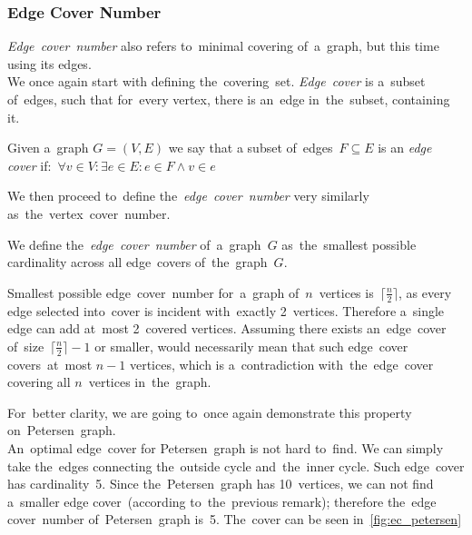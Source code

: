 \subsubsection{Edge Cover Number}
\label{subsubsec:EdgeCoverNumber}
\textit{Edge~cover~number} also refers to~minimal covering of~a~graph, but this time using its edges.\\
We once again start with defining the~covering~set. \textit{Edge~cover} is a~subset of~edges, such that for~every vertex, there is an~edge in~the~subset, containing it.
\begin{definition}
    Given a~graph ${G = (V, E)}$ we say that a subset of~edges~${F \subseteq E}$ is an \emph{edge cover} if: ${\,\forall v \in V: \exists e \in E: e \in F \land v \in e}$
\end{definition}
We then proceed to~define the~\textit{edge~cover~number} very similarly as~the~vertex~cover~number.
\begin{definition}
    We define the~\emph{edge~cover~number} of~a~graph~$G$ as~the~smallest possible cardinality across all edge~covers of~the~graph~$G$.
\end{definition}
\begin{remark}
    Smallest possible edge~cover~number for~a~graph of~$n$~vertices is~${\lceil\frac{n}{2}\rceil}$, as every edge selected into~cover is incident with~exactly 2~vertices. Therefore a~single edge can add at~most 2~covered vertices. Assuming there exists an~edge~cover of~size~${\lceil\frac{n}{2}\rceil - 1}$ or smaller, would necessarily mean that such edge~cover covers~at~most ${n - 1}$ vertices, which is a~contradiction with~the~edge~cover covering all $n$~vertices in~the~graph.
\end{remark}
For~better clarity, we are going to~once again demonstrate this property on~Petersen~graph. \\
An~optimal edge~cover for Petersen~graph is not hard to~find. We can simply take the~edges connecting the~outside cycle and~the~inner cycle. Such edge~cover has cardinality~5. Since the~Petersen~graph has 10~vertices, we can not find a~smaller edge cover~(according to~the~previous remark); therefore the~edge cover~number of~Petersen~graph is~5. The~cover can be seen in~\autoref{fig:ec_petersen}
